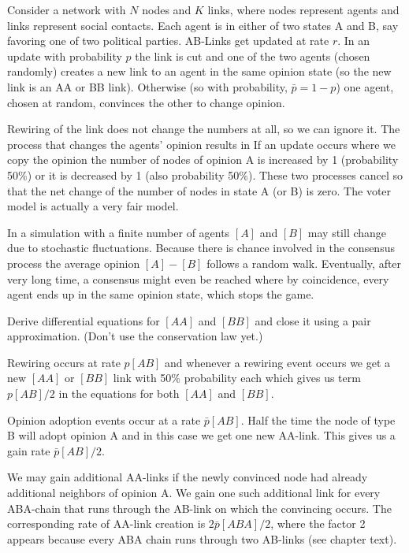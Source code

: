 Consider a network with $N$ nodes and $K$ links, where nodes represent agents and links represent social contacts. Each agent is in either of two states A and B, say favoring one of two political parties. AB-Links get updated at rate $r$. In an update with probability $p$ the link is cut and one of the two agents (chosen randomly) creates a new link to an agent in the same opinion state (so the new link is an AA or BB link). Otherwise (so with probability, $\bar{p}=1-p$) one agent, chosen at random, convinces the other to change opinion. 


\solution
Rewiring of the link does not change the numbers at all, so we can ignore it. The process that changes the agents' opinion results in 
If an update occurs where we copy the opinion the number of nodes of opinion A is increased by 1 (probability 50\%) or it is decreased by 1 (also probability 50\%). These two processes cancel so that the net change of the number of nodes in state A (or B) is zero. The voter model is actually a very fair model. 

In a simulation with a finite number of agents $[A]$ and $[B]$ may still change due to stochastic fluctuations. Because there is chance involved in the consensus process the average opinion $[A]-[B]$ follows a random walk. Eventually, after very long time, a consensus might even be reached where by coincidence, every agent ends up in the same opinion state, which stops the game. 

\subquestion
Derive differential equations for $[AA]$ and $[BB]$ and close it using a pair approximation. (Don't use the conservation law yet.)

\solution
Rewiring occurs at rate $p[AB]$ and whenever a rewiring event occurs we get a new $[AA]$ or $[BB]$ link with 50\% probability each which gives us term $p[AB]/2$ in the equations for both $[AA]$ and $[BB]$.

Opinion adoption events occur at a rate $\bar{p}[AB]$. Half the time the node of type B will adopt opinion A and in this case we get one new AA-link. This gives us a gain rate $\bar{p}[AB]/2$. 

We may gain additional AA-links if the newly convinced node had already additional neighbors of opinion A. We gain one such additional link for every ABA-chain that runs through the AB-link on which the convincing occurs. The corresponding rate of AA-link creation is $2\bar{p}[ABA]/2$, where the factor 2 appears because every ABA chain runs through two AB-links (see chapter text).

